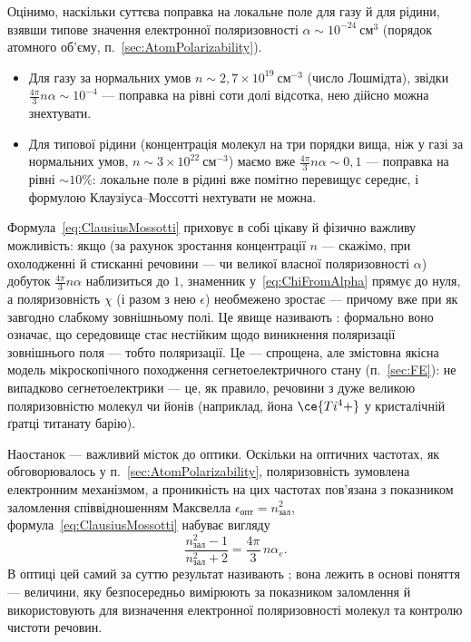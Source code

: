  Оцінимо, наскільки суттєва поправка на локальне поле для газу й для рідини, взявши типове значення електронної поляризовності
$\alpha \sim 10^{-24}\ \text{см}^3$ (порядок атомного об'єму, п.~\ref{sec:AtomPolarizability}).
\begin{itemize}
	\item Для газу за нормальних умов $n \sim 2{,}7\times10^{19}\ \text{см}^{-3}$ (число Лошмідта), звідки $\frac{4\pi}{3}n\alpha \sim 10^{-4}$ ---
	      поправка на рівні соти долі відсотка, нею дійсно можна знехтувати.
	\item Для типової рідини (концентрація молекул на три порядки вища, ніж у газі за нормальних умов, $n\sim3\times10^{22}\ \text{см}^{-3}$)
	      маємо вже $\frac{4\pi}{3}n\alpha \sim 0{,}1$ --- поправка на рівні $\sim10\%$: локальне поле в рідині вже помітно перевищує середнє, і
	      формулою Клаузіуса--Моссотті нехтувати не можна.
\end{itemize}

\begin{Attention}
	Формула~\eqref{eq:ClausiusMossotti} приховує в собі цікаву й фізично важливу можливість: якщо (за рахунок зростання концентрації $n$ --- скажімо,
	при охолодженні й стисканні речовини --- чи великої власної поляризовності $\alpha$) добуток $\frac{4\pi}{3}n\alpha$ наблизиться до $1$,
	знаменник у~\eqref{eq:ChiFromAlpha} прямує до нуля, а поляризовність $\chi$ (і разом з нею $\epsilon$) необмежено зростає --- причому вже при
	як завгодно слабкому зовнішньому полі. Це явище називають : формально воно означає, що середовище стає
	нестійким щодо виникнення поляризації  зовнішнього поля --- тобто  поляризації. Це --- спрощена, але змістовна
	якісна модель мікроскопічного походження сегнетоелектричного стану (п.~\ref{sec:FE}): не випадково сегнетоелектрики --- це, як правило,
	речовини з дуже великою поляризовністю молекул чи йонів (наприклад, йона $\ce{Ti^4+}$ у кристалічній ґратці титанату барію).
\end{Attention}

Наостанок --- важливий місток до оптики. Оскільки на оптичних частотах, як обговорювалось у
п.~\ref{sec:AtomPolarizability}, поляризовність зумовлена  електронним механізмом, а проникність на цих частотах пов'язана з
показником заломлення співвідношенням Максвелла $\epsilon_\text{опт} = n_\text{зал}^2$, формула~\eqref{eq:ClausiusMossotti} набуває вигляду
\begin{equation*}
	\frac{n_\text{зал}^2 - 1}{n_\text{зал}^2 + 2} = \frac{4\pi}{3}\, n\alpha_e.
\end{equation*}
В оптиці цей самий за суттю результат називають ; вона лежить в основі поняття  ---
величини, яку безпосередньо вимірюють за показником заломлення й використовують для визначення електронної поляризовності молекул та контролю
чистоти речовин.

